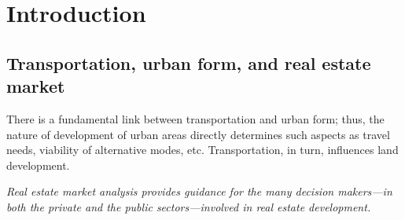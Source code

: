 \chapter[Introduction]{Introduction} \label{ch:introduction}

\section{Transportation, urban form, and real estate market} \label{sec:intro}

There is a fundamental link between transportation and urban form;
thus, the nature of development of urban areas directly determines such aspects as travel needs, viability of alternative modes, etc.
Transportation, in turn, influences land development.

\textit{Real estate market analysis provides guidance for the many decision makers—in both the private and the public sectors—involved in real estate development.}\cite{Brett}



